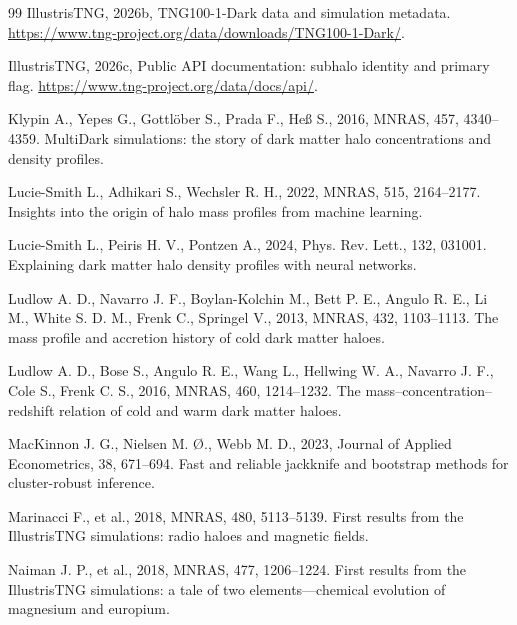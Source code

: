 \begin{thebibliography}{99}
IllustrisTNG, 2026b, TNG100-1-Dark data and simulation metadata. \url{https://www.tng-project.org/data/downloads/TNG100-1-Dark/}.

IllustrisTNG, 2026c, Public API documentation: subhalo identity and primary flag. \url{https://www.tng-project.org/data/docs/api/}.

Klypin A., Yepes G., Gottl\"ober S., Prada F., He\ss{} S., 2016, MNRAS, 457, 4340--4359. MultiDark simulations: the story of dark matter halo concentrations and density profiles. 

Lucie-Smith L., Adhikari S., Wechsler R. H., 2022, MNRAS, 515, 2164--2177. Insights into the origin of halo mass profiles from machine learning. 

Lucie-Smith L., Peiris H. V., Pontzen A., 2024, Phys. Rev. Lett., 132, 031001. Explaining dark matter halo density profiles with neural networks. 

Ludlow A. D., Navarro J. F., Boylan-Kolchin M., Bett P. E., Angulo R. E., Li M., White S. D. M., Frenk C., Springel V., 2013, MNRAS, 432, 1103--1113. The mass profile and accretion history of cold dark matter haloes. 

Ludlow A. D., Bose S., Angulo R. E., Wang L., Hellwing W. A., Navarro J. F., Cole S., Frenk C. S., 2016, MNRAS, 460, 1214--1232. The mass--concentration--redshift relation of cold and warm dark matter haloes. 

MacKinnon J. G., Nielsen M. {\O}., Webb M. D., 2023, Journal of Applied Econometrics, 38, 671--694. Fast and reliable jackknife and bootstrap methods for cluster-robust inference. 

Marinacci F., et al., 2018, MNRAS, 480, 5113--5139. First results from the IllustrisTNG simulations: radio haloes and magnetic fields. 

Naiman J. P., et al., 2018, MNRAS, 477, 1206--1224. First results from the IllustrisTNG simulations: a tale of two elements---chemical evolution of magnesium and europium. 


\end{thebibliography}
